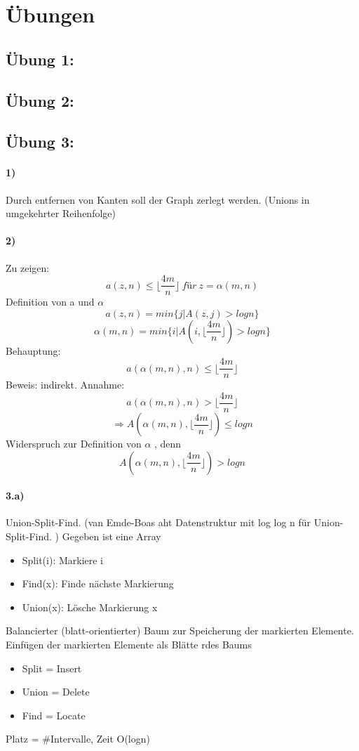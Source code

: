 

\section{Übungen}
\subsection*{Übung 1:}
\subsection*{Übung 2:}
\subsection*{Übung 3:}
\paragraph{1)} Durch entfernen von Kanten soll der Graph zerlegt werden. (Unions in umgekehrter Reihenfolge)

\paragraph{2)}
Zu zeigen:
$$ a(z,n) \leq \lfloor\frac{4m}{n}\rfloor\ für\  z=\alpha (m,n) $$
Definition von a und $ \alpha $ 
$$a(z,n) = min \{j|A(z,j) > logn \} $$
$$\alpha(m,n)=min\{i|A(i, \lfloor\frac{4m}{n}\rfloor) > logn\}$$
Behauptung:
$$a(\alpha(m,n), n) \leq \lfloor\frac{4m}{n}\rfloor$$
Beweis: indirekt. Annahme:
$$a(\alpha(m,n), n) > \lfloor\frac{4m}{n}\rfloor$$
$$\Rightarrow A(\alpha(m,n),\lfloor\frac{4m}{n}\rfloor) \leq logn $$
Widerspruch zur Definition von $ \alpha $ , denn
$$A(\alpha(m,n),\lfloor\frac{4m}{n}\rfloor) > logn $$

\paragraph{3.a)} Union-Split-Find. (van Emde-Boas aht Datenstruktur mit log log n für Union-Split-Find. ) Gegeben ist eine Array
\begin{itemize}
    \item Split(i): Markiere i
    \item Find(x): Finde nächste Markierung
    \item Union(x): Lösche Markierung x
\end{itemize}
Balancierter (blatt-orientierter) Baum zur Speicherung der markierten Elemente. Einfügen der markierten Elemente als Blätte rdes Baums
\begin{itemize}
    \item Split = Insert
    \item Union = Delete
    \item Find = Locate
\end{itemize}
Platz = \#Intervalle, Zeit O(logn)
